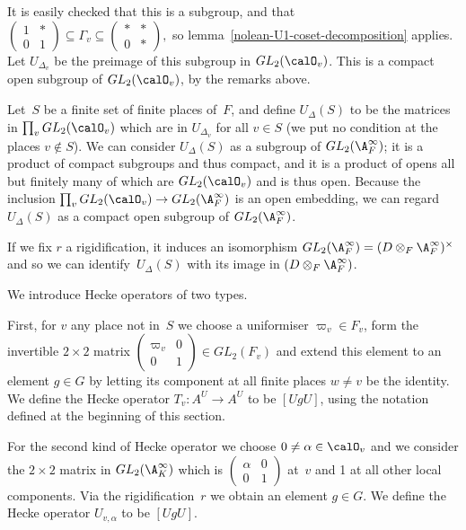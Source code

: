 It is easily checked that this is a subgroup, and that
$\begin{pmatrix}1&*\\0&1\end{pmatrix}\subseteq\Gamma_v\subseteq\begin{pmatrix}*&*\\0&*\end{pmatrix},$
so lemma~\ref{nolean-U1-coset-decomposition} applies.
Let $U_{\Delta_v}$ be the preimage of this subgroup in $GL_2(\calO_v)$.
This is a compact open subgroup of $GL_2(\calO_v)$, by the remarks above.

Let~$S$ be a finite set of finite places of~$F$, and define $U_\Delta(S)$ to be the matrices
in $\prod_v GL_2(\calO_v)$ which are in $U_{\Delta_v}$ for all $v\in S$ (we put no condition
at the places $v\notin S$). We can consider
$U_{\Delta}(S)$ as a subgroup of $GL_2(\A_F^\infty)$; it is a product of compact subgroups
and thus compact, and it is a product of opens all but finitely many of which are $GL_2(\calO_v)$
and is thus open. Because the inclusion $\prod_v GL_2(\calO_v)\to GL_2(\A_F^\infty)$ is an
open embedding, we can regard $U_\Delta(S)$ as a compact open subgroup of $GL_2(\A_F^\infty)$.

If we fix $r$ a rigidification, it
induces an isomorphism $GL_2(\A_F^\infty)=(D\otimes_F\A_F^\infty)^\times$
and so we can identify~$U_\Delta(S)$ with its image in $(D\otimes_F\A_F^\infty)$.

We introduce Hecke operators of two types.

First, for $v$ any place not in~$S$ we choose a uniformiser $\varpi_v\in F_v$,
form the invertible $2\times 2$ matrix $\begin{pmatrix}\varpi_v&0\\0&1\end{pmatrix}\in GL_2(F_v)$
and extend this element to an element $g\in G$ by letting its component at all finite places
$w\not=v$ be the identity. We define the Hecke operator $T_v:A^U\to A^U$ to be $[UgU]$, using the
notation defined at the beginning of this section.

For the second kind of Hecke operator we choose
$0\not=\alpha\in\calO_v$ and we consider the $2\times 2$ matrix in $GL_2(\A_K^\infty)$
which is $\begin{pmatrix}\alpha&0\\0&1\end{pmatrix}$ at~$v$ and 1 at all other local components.
Via the rigidification~$r$ we obtain an element $g\in G$.
We define the Hecke operator $U_{v,\alpha}$ to be $[UgU]$.

